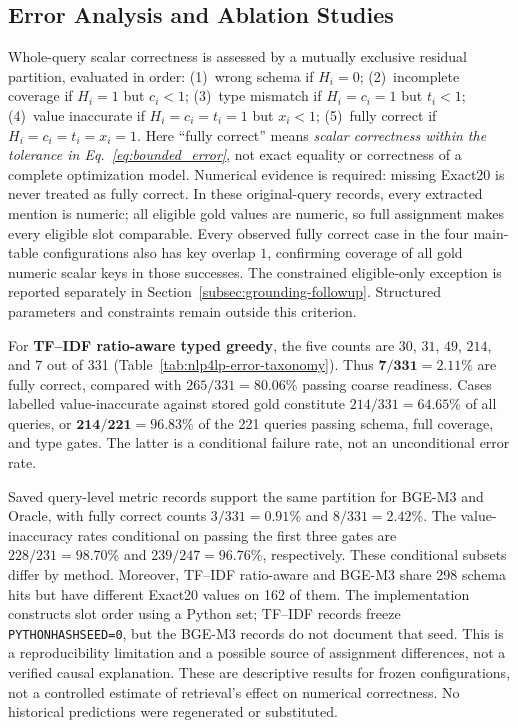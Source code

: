 \documentclass[pdflatex,sn-basic,Numbered]{sn-jnl}
\begin{document}
\subsection{Error Analysis and Ablation Studies}
\label{subsec:exp_error}

Whole-query scalar correctness is assessed by a mutually exclusive residual partition, evaluated in order: (1)~wrong schema if $H_i=0$; (2)~incomplete coverage if $H_i=1$ but $c_i<1$; (3)~type mismatch if $H_i=c_i=1$ but $t_i<1$; (4)~value inaccurate if $H_i=c_i=t_i=1$ but $x_i<1$; (5)~fully correct if $H_i=c_i=t_i=x_i=1$. Here ``fully correct'' means \emph{scalar correctness within the tolerance in Eq.~\eqref{eq:bounded_error}}, not exact equality or correctness of a complete optimization model. Numerical evidence is required: missing Exact20 is never treated as fully correct. In these original-query records, every extracted mention is numeric; all eligible gold values are numeric, so full assignment makes every eligible slot comparable. Every observed fully correct case in the four main-table configurations also has key overlap $1$, confirming coverage of all gold numeric scalar keys in those successes. The constrained eligible-only exception is reported separately in Section~\ref{subsec:grounding-followup}. Structured parameters and constraints remain outside this criterion.

For \textbf{TF--IDF ratio-aware typed greedy}, the five counts are $30$, $31$, $49$, $214$, and $7$ out of 331 (Table~\ref{tab:nlp4lp-error-taxonomy}). Thus $\mathbf{7/331=2.11\%}$ are fully correct, compared with $265/331=80.06\%$ passing coarse readiness. Cases labelled value-inaccurate against stored gold constitute $214/331=64.65\%$ of all queries, or $\mathbf{214/221=96.83\%}$ of the 221 queries passing schema, full coverage, and type gates. The latter is a conditional failure rate, not an unconditional error rate.

Saved query-level metric records support the same partition for BGE-M3 and Oracle, with fully correct counts $3/331=0.91\%$ and $8/331=2.42\%$. The value-inaccuracy rates conditional on passing the first three gates are $228/231=98.70\%$ and $239/247=96.76\%$, respectively. These conditional subsets differ by method. Moreover, TF--IDF ratio-aware and BGE-M3 share 298 schema hits but have different Exact20 values on 162 of them. The implementation constructs slot order using a Python set; TF--IDF records freeze \texttt{PYTHONHASHSEED=0}, but the BGE-M3 records do not document that seed. This is a reproducibility limitation and a possible source of assignment differences, not a verified causal explanation. These are descriptive results for frozen configurations, not a controlled estimate of retrieval's effect on numerical correctness. No historical predictions were regenerated or substituted.
\end{document}
